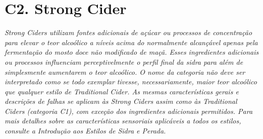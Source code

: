 \section*{C2. Strong Cider}
\textit{Strong Ciders utilizam fontes adicionais de açúcar ou processos de concentração para elevar o teor alcoólico a níveis acima do normalmente alcançável apenas pela fermentação do mosto doce não modificado de maçã. Esses ingredientes adicionais ou processos influenciam perceptivelmente o perfil final da sidra para além de simplesmente aumentarem o teor alcoólico. O nome da categoria não deve ser interpretado como se todo exemplar tivesse, necessariamente, maior teor alcoólico que qualquer estilo de Traditional Cider. As mesmas características gerais e descrições de falhas se aplicam às Strong Ciders assim como às Traditional Ciders (categoria C1), com exceção dos ingredientes adicionais permitidos. Para mais detalhes sobre as características sensoriais aplicáveis a todos os estilos, consulte a Introdução aos Estilos de Sidra e Perada.}
